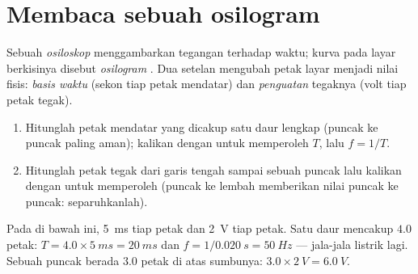 \section{Membaca sebuah osilogram}

\begin{definition}[Osiloskop]\label{def:g10:signals-and-waves:oscilloscope}
Sebuah \emph{osiloskop} menggambarkan tegangan terhadap
waktu; kurva pada layar berkisinya disebut \emph{osilogram}%
. Dua setelan mengubah petak layar menjadi nilai fisis:
\emph{basis waktu} (sekon tiap petak mendatar) dan
\emph{penguatan} tegaknya (volt tiap petak tegak).
\end{definition}

\begin{method}\label{met:g10:signals-and-waves:oscillogram}
\begin{enumerate}
  \item Hitunglah petak mendatar yang dicakup satu daur lengkap (puncak
        ke puncak paling aman); kalikan dengan  untuk
        memperoleh $T$, lalu $f = 1/T$.
  \item Hitunglah petak tegak dari garis tengah sampai sebuah puncak
        lalu kalikan dengan  untuk memperoleh 
        (puncak ke lembah memberikan nilai puncak ke puncak:
        separuhkanlah).
\end{enumerate}
\end{method}

\begin{example}\label{ex:g10:signals-and-waves:reading}
Pada  di bawah ini,  \qty{5}{ms} tiap petak dan
 \qty{2}{V} tiap petak. Satu daur mencakup $4.0$ petak:
$T = 4.0 \times \qty{5}{ms} = \qty{20}{ms}$ dan
$f = 1/\qty{0.020}{s} = \qty{50}{Hz}$ --- jala-jala listrik lagi. Sebuah
puncak berada $3.0$ petak di atas sumbunya: 
$3.0 \times \qty{2}{V} = \qty{6.0}{V}$.
\end{example}

